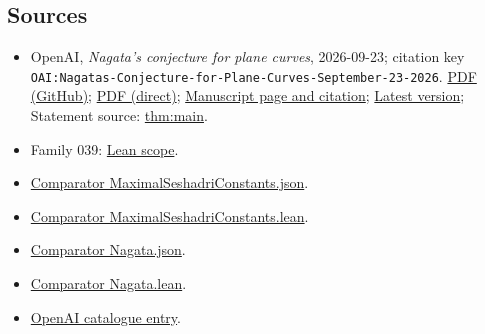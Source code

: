 \documentclass[11pt]{article}
\begin{document}
\subsection{Sources}
\begin{itemize}
\item OpenAI, \emph{Nagata's conjecture for plane curves}, 2026-09-23; citation key \texttt{OAI:Nagatas-Conjecture-for-Plane-Curves-September-23-2026}. \href{https://github.com/openai/math/blob/adc7f1241b42e322a6451854ab7e4b4c146bf78a/preprints/Nagatas-Conjecture-for-Plane-Curves-September-23-2026/main.pdf}{PDF (GitHub)}; \href{https://github.com/openai/math/raw/adc7f1241b42e322a6451854ab7e4b4c146bf78a/preprints/Nagatas-Conjecture-for-Plane-Curves-September-23-2026/main.pdf}{PDF (direct)}; \href{https://github.com/openai/math/blob/adc7f1241b42e322a6451854ab7e4b4c146bf78a/preprints/Nagatas-Conjecture-for-Plane-Curves-September-23-2026/README.md}{Manuscript page and citation}; \href{https://github.com/openai/math/blob/main/preprints/Nagatas-Conjecture-for-Plane-Curves-September-23-2026/main.pdf}{Latest version}; Statement source: \href{https://github.com/openai/math/blob/adc7f1241b42e322a6451854ab7e4b4c146bf78a/preprints/Nagatas-Conjecture-for-Plane-Curves-September-23-2026/build/sections/introduction.tex\#L31}{thm:main}.
\item Family 039: \href{https://github.com/openai/math/blob/adc7f1241b42e322a6451854ab7e4b4c146bf78a/lean/docs/039.md}{Lean scope}.
\item \href{https://github.com/openai/math/blob/adc7f1241b42e322a6451854ab7e4b4c146bf78a/lean/ComparatorChallenges/MaximalSeshadriConstants.json}{Comparator MaximalSeshadriConstants.json}.
\item \href{https://github.com/openai/math/blob/adc7f1241b42e322a6451854ab7e4b4c146bf78a/lean/ComparatorChallenges/MaximalSeshadriConstants.lean}{Comparator MaximalSeshadriConstants.lean}.
\item \href{https://github.com/openai/math/blob/adc7f1241b42e322a6451854ab7e4b4c146bf78a/lean/ComparatorChallenges/Nagata.json}{Comparator Nagata.json}.
\item \href{https://github.com/openai/math/blob/adc7f1241b42e322a6451854ab7e4b4c146bf78a/lean/ComparatorChallenges/Nagata.lean}{Comparator Nagata.lean}.
\item \href{https://github.com/openai/math/blob/adc7f1241b42e322a6451854ab7e4b4c146bf78a/CONTENTS.md}{OpenAI catalogue entry}.
\end{itemize}
\end{document}
